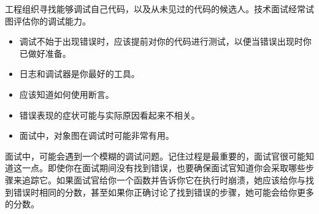 工程组织寻找能够调试自己代码，以及从未见过的代码的候选人。技术面试经常试图评估你的调试能力。


\begin{itemize}
\item
调试不始于出现错误时，应该提前对你的代码进行测试，以便当错误出现时你已做好准备。

\item
日志和调试器是你最好的工具。

\item
应该知道如何使用断言。

\item
错误表现的症状可能与实际原因看起来不相关。

\item
面试中，对象图在调试时可能非常有用。
\end{itemize}


面试中，可能会遇到一个模糊的调试问题。记住过程是最重要的，面试官很可能知道这一点。即使你在面试期间没有找到错误，也要确保面试官知道你会采取哪些步骤来追踪它。如果面试官给你一个函数并告诉你它在执行时崩溃，她应该给你与找到错误时相同的分数，甚至如果你正确讨论了找到错误的步骤，她可能会给你更多的分数。
